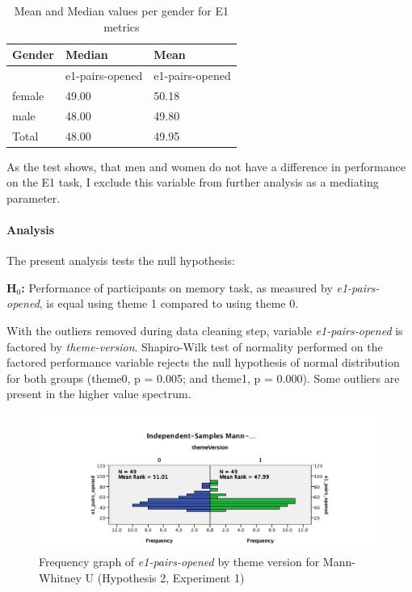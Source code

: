 		\begin{table}[]
			\centering
			\begin{tabular}{l|l|l}
				Gender & Median & Mean       \\ \hline
				& e1-pairs-opened  & e1-pairs-opened		\\ \hline
				female & 49.00              & 50.18                 	 \\
				male   & 48.00              & 49.80                   	 \\ \hline
				Total  & 48.00              & 49.95                  	 \\ \hline \hline
			\end{tabular}
			\caption{Mean and Median values per gender for E1 metrics}
			\label{tbl:e1means}
		\end{table}
	
		As the test shows, that men and women do not have a difference in performance on the E1 task, I exclude this variable from further analysis as a mediating parameter.
		
		\paragraph{Analysis} 
		
		The present analysis tests the null hypothesis:
		
		\textbf{H$_{0}$:} Performance of participants on memory task, as measured by \textit{e1-pairs-opened}, is equal using theme 1 compared to using theme 0.
		
		With the outliers removed during data cleaning step, variable \textit{e1-pairs-opened} is factored by \textit{theme-version}. Shapiro-Wilk test of normality performed on the factored performance variable rejects the null hypothesis of normal distribution for both groups (theme0, p = 0.005; and theme1, p = 0.000).
		Some outliers are present in the higher value spectrum.
		
		\begin{figure}
			\centering
			\includegraphics[width=1\linewidth]{graphics/H2E1-MannWhitneyU}
			\caption{Frequency graph of \textit{e1-pairs-opened} by theme version for Mann-Whitney U (Hypothesis 2, Experiment 1)}
			\label{fig:h2e1-mannwhitneyu}
		\end{figure}
		
